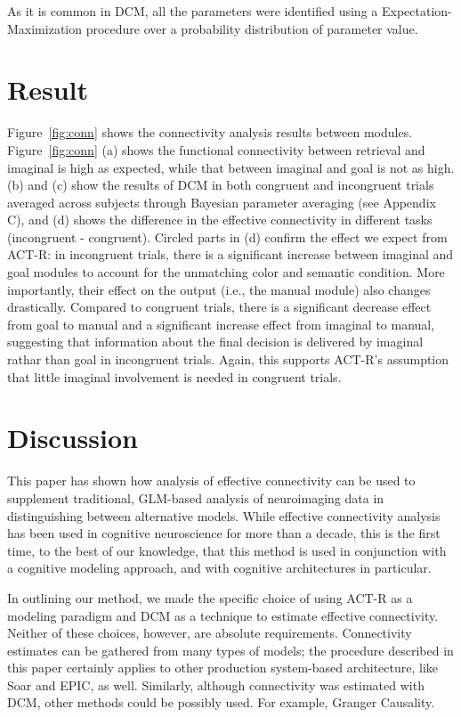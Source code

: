 \documentclass[10pt,letterpaper]{article}
\begin{document}
As it is common in DCM, all the parameters were identified using a Expectation-Maximization procedure over a probability distribution of parameter value. 

 
\section{Result}

Figure~\ref{fig:conn} shows the connectivity analysis results between modules. Figure~\ref{fig:conn} (a) shows the functional connectivity between retrieval and imaginal is high as expected, while that between imaginal and goal is not as high. (b) and (c) show the results of DCM in both congruent and incongruent trials averaged across subjects through Bayesian parameter averaging \cite{Kasess2010} (see Appendix C), and (d) shows the difference in the effective connectivity in different tasks (incongruent - congruent). Circled parts in (d) confirm the effect we expect from ACT-R: in incongruent trials, there is a significant increase between imaginal and goal modules to account for the unmatching color and semantic condition. More importantly, their effect on the output (i.e., the manual module) also changes drastically. Compared to congruent trials, there is a significant decrease effect from goal to manual and a significant increase effect from imaginal to manual, suggesting that information about the final decision is delivered by imaginal rathar than goal in incongruent trials. Again, this supports ACT-R's assumption that little imaginal involvement is needed in congruent trials. 

\section{Discussion}

This paper has shown how analysis of effective connectivity can be used to supplement traditional, GLM-based analysis of neuroimaging data in distinguishing between alternative models. While effective connectivity analysis has been used in cognitive neuroscience for more than a decade, this is the first time, to the best of our knowledge, that this method is used in conjunction with a cognitive modeling approach, and with cognitive architectures in particular.

In outlining our method, we made the specific choice of using ACT-R as a modeling paradigm and DCM as a technique to estimate effective connectivity. Neither of these choices, however, are absolute requirements. Connectivity estimates can be gathered from many types of models; the procedure described in this paper certainly applies to other production system-based architecture, like Soar and EPIC, as well. Similarly, although connectivity was estimated with DCM,  other methods could be possibly used. For example, Granger Causality. %
\end{document}
